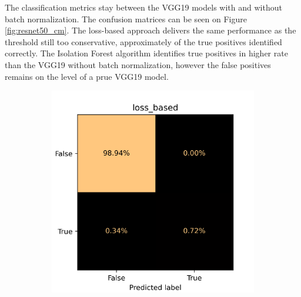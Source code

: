 The classification metrics stay between the VGG19 models with and without batch normalization.
The confusion matrices can be seen on Figure \ref{fig:resnet50_cm}.
The loss-based approach delivers the same performance as the threshold still too conservative,
approximately \small {} of the true positives identified correctly.
The Isolation Forest algorithm identifies true positives in higher rate than the VGG19 without
batch normalization, however the false positives remains on the level of a prue VGG19 model.

\begin{figure}[!ht]
    \centering
    \begin{subfigure}{0.4\textwidth}
        \centering
        \includegraphics[width=\textwidth]{./results/resnet50_vgg19/20230514_213740_loss_based_cm.png}
    \end{subfigure}
    \begin{subfigure}{0.4\textwidth}
        \centering

\end{subfigure}
\end{figure}
